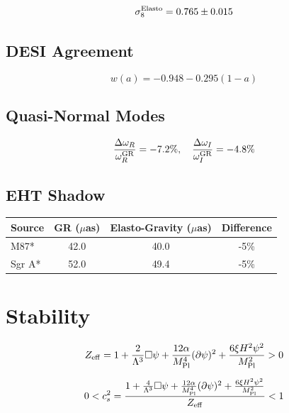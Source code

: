 \documentclass[aps,prd,preprint,superscriptaddress]{revtex4-2}
\newcommand{\Mpl}{M_{\rm Pl}}
\newcommand{\Lamb}{\Lambda}
\newcommand{\scal}{\psi}
\begin{document}
\begin{equation}
\sigma_8^{\rm Elasto} = 0.765 \pm 0.015
\end{equation}

\subsection{DESI Agreement}

\begin{equation}
w(a) = -0.948 - 0.295(1-a)
\end{equation}

\subsection{Quasi-Normal Modes}

\begin{equation}
\frac{\Delta\omega_R}{\omega_R^{\rm GR}} = -7.2\%, \quad \frac{\Delta\omega_I}{\omega_I^{\rm GR}} = -4.8\%
\end{equation}

\subsection{EHT Shadow}

\begin{table}[h]
\centering
\begin{tabular}{lccc}
\toprule
Source & GR ($\mu$as) & Elasto-Gravity ($\mu$as) & Difference \\
\midrule
M87* & 42.0 & 40.0 & -5\% \\
Sgr A* & 52.0 & 49.4 & -5\% \\
\bottomrule
\end{tabular}
\end{table}

\section{Stability}

\begin{equation}
Z_{\rm eff} = 1 + \frac{2}{\Lamb^3}\Box\scal + \frac{12\alpha}{\Mpl^4}(\partial\scal)^2 + \frac{6\xi H^2\scal^2}{\Mpl^2} > 0
\end{equation}

\begin{equation}
0 < c_s^2 = \frac{1 + \frac{4}{\Lamb^3}\Box\scal + \frac{12\alpha}{\Mpl^4}(\partial\scal)^2 + \frac{6\xi H^2\scal^2}{\Mpl^2}}{Z_{\rm eff}} < 1
\end{equation}
\end{document}
